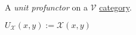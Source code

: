 A \emph{unit profunctor} on a $\mathcal{V}$ \href{doc/1 math/Seven Sketches in Compositionality/Chapter 2: Resource theories/3 Enrichment/1 V-categories/1 V-category}{category}.

$U_\mathcal{X}(x,y):=\mathcal{X}(x,y)$
